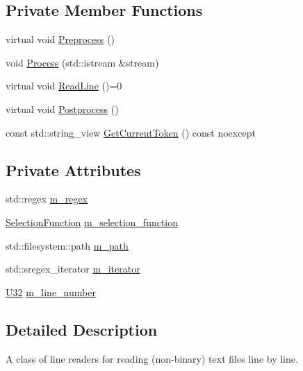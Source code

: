 \subsection*{Private Member Functions}
\begin{DoxyCompactItemize}
\item 
virtual void \mbox{\hyperlink{classmage_1_1_line_reader_ad81a84bf9ecd81b9a391698afbd5eb61}{Preprocess}} ()
\item 
void \mbox{\hyperlink{classmage_1_1_line_reader_ad351b7c68e5784d0dca690a5b8fe7528}{Process}} (std\+::istream \&stream)
\item 
virtual void \mbox{\hyperlink{classmage_1_1_line_reader_a8c81989a9d59ae31dd19e6d3961cfaf1}{Read\+Line}} ()=0
\item 
virtual void \mbox{\hyperlink{classmage_1_1_line_reader_a51775e07b5f7c9f72441e42d6d3896e1}{Postprocess}} ()
\item 
const std\+::string\+\_\+view \mbox{\hyperlink{classmage_1_1_line_reader_a543a1b133b0067cbe69e81dbad5ea0e1}{Get\+Current\+Token}} () const noexcept
\end{DoxyCompactItemize}
\subsection*{Private Attributes}
\begin{DoxyCompactItemize}
\item 
std\+::regex \mbox{\hyperlink{classmage_1_1_line_reader_a2b3c9c2f693971765c03db3752edc339}{m\+\_\+regex}}
\item 
\mbox{\hyperlink{classmage_1_1_line_reader_a17bbae61a3ce30bdb251d6c76e1a4522}{Selection\+Function}} \mbox{\hyperlink{classmage_1_1_line_reader_a69f3eac618227e43eb7d55aec475d2ff}{m\+\_\+selection\+\_\+function}}
\item 
std\+::filesystem\+::path \mbox{\hyperlink{classmage_1_1_line_reader_a05436c40af16b882c2ebd515287598f7}{m\+\_\+path}}
\item 
std\+::sregex\+\_\+iterator \mbox{\hyperlink{classmage_1_1_line_reader_a106f89e663b174b5b55bfdf79fbca901}{m\+\_\+iterator}}
\item 
\mbox{\hyperlink{namespacemage_a41c104c036fba3756a74e19f793eeaa1}{U32}} \mbox{\hyperlink{classmage_1_1_line_reader_ab145590a7e115106c0987905fde98393}{m\+\_\+line\+\_\+number}}
\end{DoxyCompactItemize}


\subsection{Detailed Description}
A class of line readers for reading (non-\/binary) text files line by line. 

